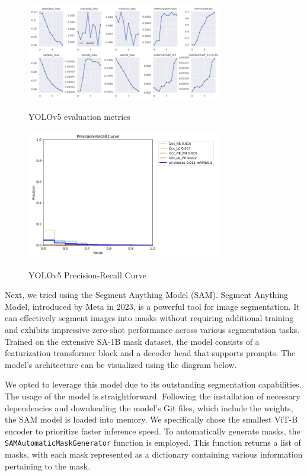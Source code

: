 \documentclass{article}
\begin{document}
\begin{figure}[tbh]
    \begin{center}
        \includegraphics[width=8.5cm]{yolo_evaluation.png}\
        \caption{YOLOv5 evaluation metrics\label{yolo_evaluation}} 
    \end{center}
\end{figure}

\begin{figure}[tbh]
    \begin{center}
        \includegraphics[width=8.5cm]{yolo_recall.png}\
        \caption{YOLOv5 Precision-Recall Curve\label{yolo_recall}} 
    \end{center}
\end{figure}

Next, we tried using the Segment Anything Model (SAM). Segment Anything Model, introduced by Meta in 2023, is a powerful tool for image segmentation. It can effectively segment images into masks without requiring additional training and exhibits impressive zero-shot performance across various segmentation tasks. Trained on the extensive SA-1B mask dataset, the model consists of a featurization transformer block and a decoder head that supports prompts. The model's architecture can be visualized using the diagram below.

We opted to leverage this model due to its outstanding segmentation capabilities. The usage of the model is straightforward. Following the installation of necessary dependencies and downloading the model's Git files, which include the weights, the SAM model is loaded into memory. We specifically chose the smallest ViT-B encoder to prioritize faster inference speed. To automatically generate masks, the \texttt{SAMAutomaticMaskGenerator} function is employed. This function returns a list of masks, with each mask represented as a dictionary containing various information pertaining to the mask.
\end{document}
